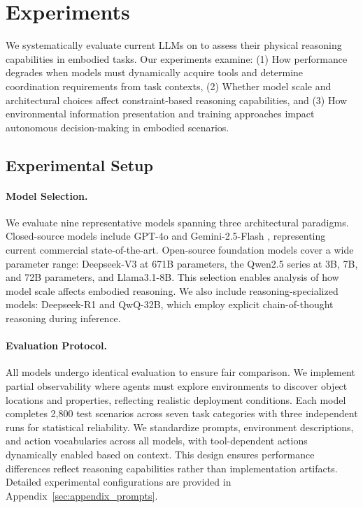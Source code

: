 \section{Experiments}


We systematically evaluate current LLMs on \benchmark to assess their physical reasoning capabilities in embodied tasks. Our experiments examine: (1) How performance degrades when models must dynamically acquire tools and determine coordination requirements from task contexts, (2) Whether model scale and architectural choices affect constraint-based reasoning capabilities, and (3) How environmental information presentation and training approaches impact autonomous decision-making in embodied scenarios.

\subsection{Experimental Setup}

\paragraph{Model Selection.}
We evaluate nine representative models spanning three architectural paradigms. Closed-source models include GPT-4o \citep{hurst2024gpt} and Gemini-2.5-Flash \citep{comanici2025gemini}, representing current commercial state-of-the-art. Open-source foundation models cover a wide parameter range: Deepseek-V3 \citep{liu2024deepseek} at 671B parameters, the Qwen2.5 series \citep{team2024qwen2} at 3B, 7B, and 72B parameters, and Llama3.1-8B\citep{touvron2023llama}. This selection enables analysis of how model scale affects embodied reasoning. We also include reasoning-specialized models: Deepseek-R1 \citep{guo2025deepseek} and QwQ-32B\citep{li2024datacomp}, which employ explicit chain-of-thought reasoning during inference.

\paragraph{Evaluation Protocol.}
All models undergo identical evaluation to ensure fair comparison. We implement partial observability where agents must explore environments to discover object locations and properties, reflecting realistic deployment conditions. Each model completes 2,800 test scenarios across seven task categories with three independent runs for statistical reliability. We standardize prompts, environment descriptions, and action vocabularies across all models, with tool-dependent actions dynamically enabled based on context. This design ensures performance differences reflect reasoning capabilities rather than implementation artifacts. Detailed experimental configurations are provided in Appendix~\ref{sec:appendix_prompts}.

